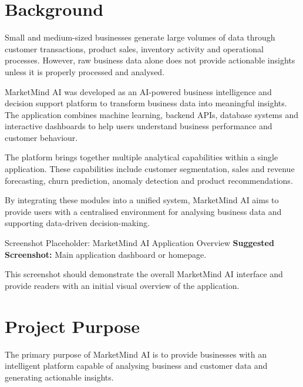\documentclass[12pt,a4paper]{report}
\begin{document}
\section{Background}

Small and medium-sized businesses generate large volumes of data through
customer transactions, product sales, inventory activity and operational
processes. However, raw business data alone does not provide actionable
insights unless it is properly processed and analysed.

MarketMind AI was developed as an AI-powered business intelligence and
decision support platform to transform business data into meaningful
insights. The application combines machine learning, backend APIs,
database systems and interactive dashboards to help users understand
business performance and customer behaviour.

The platform brings together multiple analytical capabilities within a
single application. These capabilities include customer segmentation,
sales and revenue forecasting, churn prediction, anomaly detection and
product recommendations.

By integrating these modules into a unified system, MarketMind AI aims to
provide users with a centralised environment for analysing business data
and supporting data-driven decision-making.

\begin{screenshotplaceholder}{Screenshot Placeholder: MarketMind AI Application Overview}
\textbf{Suggested Screenshot:} Main application dashboard or homepage.

\vspace{0.2cm}

This screenshot should demonstrate the overall MarketMind AI interface
and provide readers with an initial visual overview of the application.
\end{screenshotplaceholder}



\section{Project Purpose}

The primary purpose of MarketMind AI is to provide businesses with an
intelligent platform capable of analysing business and customer data and
generating actionable insights.
\end{document}
